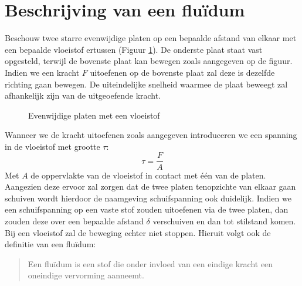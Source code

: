 	\FloatBarrier
	\section{Beschrijving van een flu\"idum}
	\label{sec:Beschrijving van een fluidum}
Beschouw twee starre evenwijdige platen op een bepaalde afstand van elkaar met een bepaalde vloeistof ertussen (Figuur \ref{fig:Evenwijdige platen}). De onderste plaat staat vast opgesteld, terwijl de bovenste plaat kan bewegen zoals aangegeven op de figuur. Indien we een kracht $F$ uitoefenen op de bovenste plaat zal deze is dezelfde richting gaan bewegen. De uiteindelijke snelheid waarmee de plaat beweegt zal afhankelijk zijn van de uitgeoefende kracht.
\begin{figure}[htb]
	\centering
	
	\caption{Evenwijdige platen met een vloeistof }
	\label{fig:Evenwijdige platen}
\end{figure}
Wanneer we de kracht uitoefenen zoals aangegeven introduceren we een spanning in de vloeistof met grootte $\tau$:
\begin{equation}
	\tau = \frac{F}{A}
\end{equation}
Met $A$ de oppervlakte van de vloeistof in contact met \'e\'en van de platen. Aangezien deze ervoor zal zorgen dat de twee platen tenopzichte van elkaar gaan schuiven wordt hierdoor de naamgeving schuifspanning ook duidelijk. Indien we een schuifspanning op een vaste stof zouden uitoefenen via de twee platen, dan zouden deze over een bepaalde afstand $\delta$ verschuiven en dan tot stilstand komen. Bij een vloeistof zal de beweging echter niet stoppen. Hieruit volgt ook de definitie van een flu\"idum:

\begin{quotation}
	Een flu\"idum is een stof die onder invloed van een eindige kracht een oneindige vervorming aanneemt.
\end{quotation}

